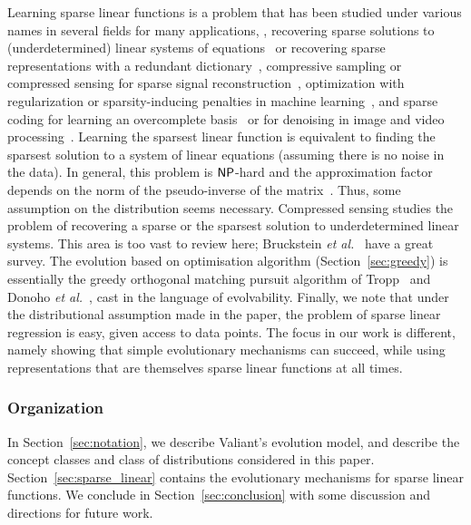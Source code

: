 Learning sparse linear functions is a problem that has been studied under
various names in several fields for many applications, \eg, recovering
sparse solutions to (underdetermined) linear systems of
equations~\cite{Donoho:2009-sparse} or recovering sparse representations
with a redundant dictionary~\cite{Mallat:2008,Elad:2010}, compressive sampling
or compressed sensing for sparse signal reconstruction~\cite{Candes:2008},
optimization with regularization or sparsity-inducing penalties in machine
learning~\cite{Bach:2012}, and sparse coding for learning an overcomplete
basis~\cite{Olshausen:1997} or for denoising in image and video
processing~\cite{Elad:2010}. Learning
the sparsest linear function is equivalent to finding the sparsest solution to a
system of linear equations (assuming there is no noise in the data). In general,
this problem is $\mathsf{NP}$-hard and the approximation factor depends on the norm of
the pseudo-inverse of the matrix~\cite{Natarajan:1995}. Thus, some assumption on
the distribution seems necessary. Compressed sensing studies the problem of
recovering a sparse or the sparsest solution to underdetermined linear systems.
This area is too vast to review here; Bruckstein \emph{et
al.}~\cite{Donoho:2009-sparse} have a great survey. The evolution based on
optimisation algorithm (Section~\ref{sec:greedy}) is essentially the greedy
orthogonal matching pursuit algorithm of Tropp~\cite{Tropp:2004-greed} and
Donoho \emph{et al.}~\cite{Donoho:2006-recovery}, cast in the language of
evolvability. Finally, we note that under the distributional assumption made in
the paper, the problem of sparse linear regression is easy, given access to data
points. The focus in our work is different, namely showing that simple
evolutionary mechanisms can succeed, while using representations that are
themselves sparse linear functions at all times.

\subsubsection*{Organization}

In Section~\ref{sec:notation}, we describe Valiant's evolution model, and describe
the concept classes and class of distributions considered in this paper.
Section~\ref{sec:sparse_linear} contains the evolutionary mechanisms for sparse
linear functions. We conclude in Section~\ref{sec:conclusion} with some
discussion and directions for future work.
